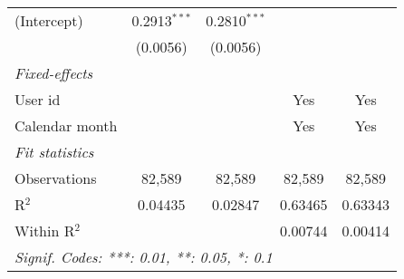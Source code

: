 \begin{table}[htbp]
\begin{normalsize}
\begin{tabular}{lcccc}
         (Intercept)                      & 0.2913$^{***}$          & 0.2810$^{***}$          &                 &   \\
                                          & (0.0056)                & (0.0056)                &                 &   \\
         \midrule \emph{Fixed-effects} &   &   &   &  \\
         User id                          &                         &                         & Yes             & Yes\\
         Calendar month                   &                         &                         & Yes             & Yes\\
         \midrule \emph{Fit statistics} &   &   &   &  \\
         Observations                     & 82,589                  & 82,589                  & 82,589          & 82,589\\
         R$^2$                            & 0.04435                 & 0.02847                 & 0.63465         & 0.63343\\
         Within R$^2$                     &                         &                         & 0.00744         & 0.00414\\
         \midrule\midrule\multicolumn{5}{l}{\emph{Signif. Codes: ***: 0.01, **: 0.05, *: 0.1}}\\
      \end{tabular}
   \end{normalsize}
\end{table}



